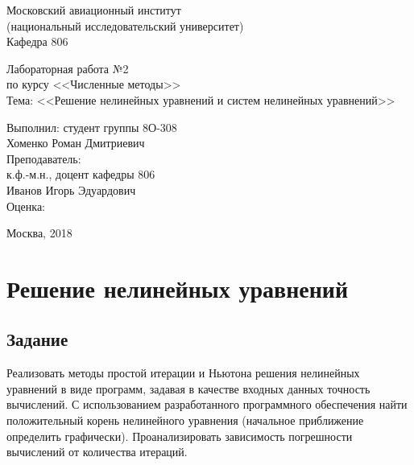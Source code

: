 \documentclass[a4paper,12pt]{article}
\begin{document}
\begin{titlepage}
\begin{center}
    {Московский авиационный институт} \\
    {(национальный исследовательский университет)} \\
    {Кафедра 806}

\vspace{8cm}
\large{
    {Лабораторная работа №2} \\
    {по курсу <<Численные методы>>} \\
    {Тема: <<Решение нелинейных уравнений и систем нелинейных уравнений>>}
}
\end{center}

\vspace{6cm}
\begin{flushright}
\begin{minipage}{0.4\textwidth}
    \begin{flushleft}
        {Выполнил: студент группы 8О-308} \\
        {Хоменко Роман Дмитриевич} \\
        \vspace{0.5cm}
        {Преподаватель:} \\
        {к.ф.-м.н., доцент кафедры 806} \\
        {Иванов Игорь Эдуардович} \\
        \vspace{0.5cm}
        Оценка:
    \end{flushleft}
\end{minipage}
\end{flushright}

\vfill
\begin{center}
    {Москва, 2018}
\end{center}

\end{titlepage}

\section{Решение нелинейных уравнений}
\subsection{Задание}
Реализовать методы простой итерации и Ньютона решения нелинейных уравнений
в виде программ, задавая в качестве входных данных точность вычислений. С
использованием разработанного программного обеспечения найти положительный
корень нелинейного уравнения (начальное приближение определить графически).
Проанализировать зависимость погрешности вычислений от количества итераций.
\end{document}
